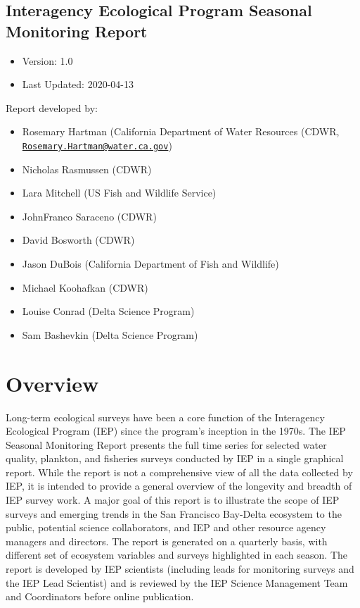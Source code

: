 \documentclass[
]{book}
\providecommand{\tightlist}{%
  \setlength{\itemsep}{0pt}\setlength{\parskip}{0pt}}
\begin{document}
\hypertarget{interagency-ecological-program-seasonal-monitoring-report}{%
\subsection{Interagency Ecological Program Seasonal Monitoring Report}\label{interagency-ecological-program-seasonal-monitoring-report}}

\begin{itemize}
\tightlist
\item
  Version: 1.0
\item
  Last Updated: 2020-04-13
\end{itemize}

Report developed by:

\begin{itemize}
\tightlist
\item
  Rosemary Hartman (California Department of Water Resources (CDWR, \href{mailto:Rosemary.Hartman@water.ca.gov}{\nolinkurl{Rosemary.Hartman@water.ca.gov}})
\item
  Nicholas Rasmussen (CDWR)
\item
  Lara Mitchell (US Fish and Wildlife Service)
\item
  JohnFranco Saraceno (CDWR)
\item
  David Bosworth (CDWR)
\item
  Jason DuBois (California Department of Fish and Wildlife)
\item
  Michael Koohafkan (CDWR)
\item
  Louise Conrad (Delta Science Program)
\item
  Sam Bashevkin (Delta Science Program)
\end{itemize}

\hypertarget{overview}{%
\section{Overview}\label{overview}}

Long-term ecological surveys have been a core function of the Interagency Ecological Program (IEP) since the program's inception in the 1970s. The IEP Seasonal Monitoring Report presents the full time series for selected water quality, plankton, and fisheries surveys conducted by IEP in a single graphical report. While the report is not a comprehensive view of all the data collected by IEP, it is intended to provide a general overview of the longevity and breadth of IEP survey work. A major goal of this report is to illustrate the scope of IEP surveys and emerging trends in the San Francisco Bay-Delta ecosystem to the public, potential science collaborators, and IEP and other resource agency managers and directors. The report is generated on a quarterly basis, with different set of ecosystem variables and surveys highlighted in each season. The report is developed by IEP scientists (including leads for monitoring surveys and the IEP Lead Scientist) and is reviewed by the IEP Science Management Team and Coordinators before online publication.
\end{document}
